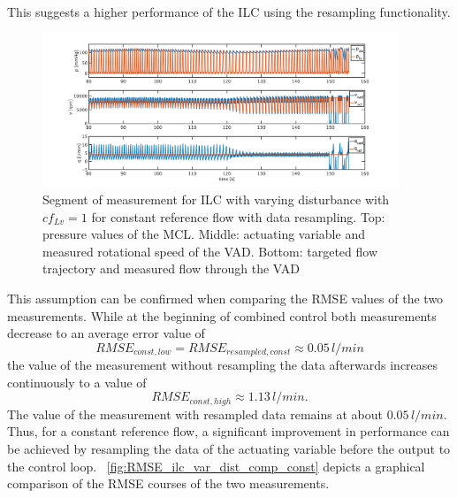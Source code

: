 \\This suggests a higher performance of the ILC using the resampling functionality.
\begin{figure}[ht!]
  \centering
  \includegraphics[width=0.95\textwidth]{images/chapt_5/ILC/ilc_var_dist_fix_const.pdf}
  \caption[Segment of measurement for ILC with varying disturbance with $cf_{Lv}=1$ for constant reference flow with data resampling]{Segment of measurement for ILC with varying disturbance with $cf_{Lv}=1$ for constant reference flow with data resampling. Top:  pressure values of the MCL. Middle: actuating variable and measured rotational speed of the VAD. Bottom: targeted flow trajectory and measured flow through the VAD}
  \label{fig:ilc_var_dist_fix_const}
\end{figure}
This assumption can be confirmed when comparing the RMSE values of the two measurements.
While at the beginning of combined control both measurements decrease to an average error value of
\begin{equation}
  RMSE_{const,low}=RMSE_{resampled,const}\approx0.05\,l/min
\end{equation}
 the value of the measurement without resampling the data afterwards increases continuously to a value of
\begin{equation}
  RMSE_{const,high}\approx1.13\,l/min.
\end{equation}
The value of the measurement with resampled data remains at about $0.05\,l/min$. Thus, for a constant reference flow, a significant improvement in performance can be achieved by resampling the data of the actuating variable before the output to the control loop.
\figurename~\ref{fig:RMSE_ilc_var_dist_comp_const} depicts a graphical comparison of the RMSE courses of the two measurements.
